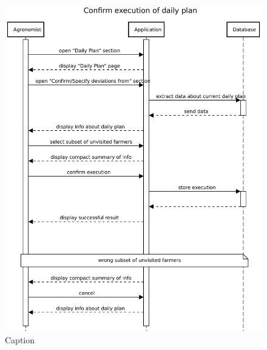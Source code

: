 \begin{figure}[H]
    \centering
    \includegraphics[scale=0.75]{Images/Sequence diagrams/Agronomist - confirm execution of daily plan.pdf}
    \caption{Caption}
    \label{fig:my_label}
\end{figure}